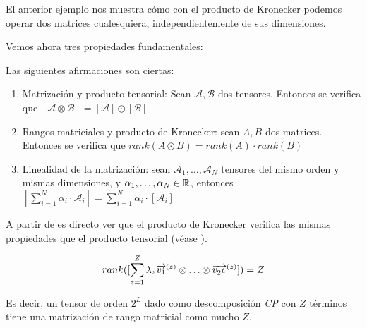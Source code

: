 \begin{observacion}
    El anterior ejemplo nos muestra cómo con el producto de Kronecker podemos operar dos matrices cualesquiera, independientemente de sus dimensiones.
\end{observacion}

Vemos ahora tres propiedades fundamentales:

\begin{proposicion} Las siguientes afirmaciones son ciertas:

    \begin{enumerate}
        \item Matrización y producto tensorial: Sean $\mathcal{A}, \mathcal{B}$ dos tensores. Entonces se verifica que $[\mathcal{A} \otimes \mathcal{B}] = [\mathcal{A}] \odot [\mathcal{B}]$ \label{prop:prop_fundamentales_primera}
        \item Rangos matriciales y producto de Kronecker: sean $A, B$ dos matrices. Entonces se verifica que $rank(A \odot B) = rank(A) \cdot rank(B)$
        \item Linealidad de la matrización: sean $\mathcal{A}_1, \ldots, \mathcal{A}_N$ tensores del mismo orden y mismas dimensiones, y $\alpha_1, \ldots, \alpha_N \in \mathbb{R}$, entonces $[\sum_{i = 1}^N \alpha_i \cdot \mathcal{A}_i] = \sum_{i = 1}^N \alpha_i \cdot [\mathcal{A}_i]$
    \end{enumerate}

\end{proposicion}

\begin{observacion} A partir de  es directo ver que el producto de Kronecker verifica las mismas propiedades que el producto tensorial (véase ).
\end{observacion}

\begin{proposicion}

    \begin{equation}
        rank([\sum_{z = 1}^Z \lambda_z \overrightarrow{v_1}^{(z)} \otimes \ldots \otimes \overrightarrow{v_{2^L}}^{(z)}]) = Z
    \end{equation}

    Es decir, un tensor de orden $2^L$ dado como descomposición \textit{CP} con $Z$ términos tiene una matrización de rango matricial como mucho $Z$.

\end{proposicion}

